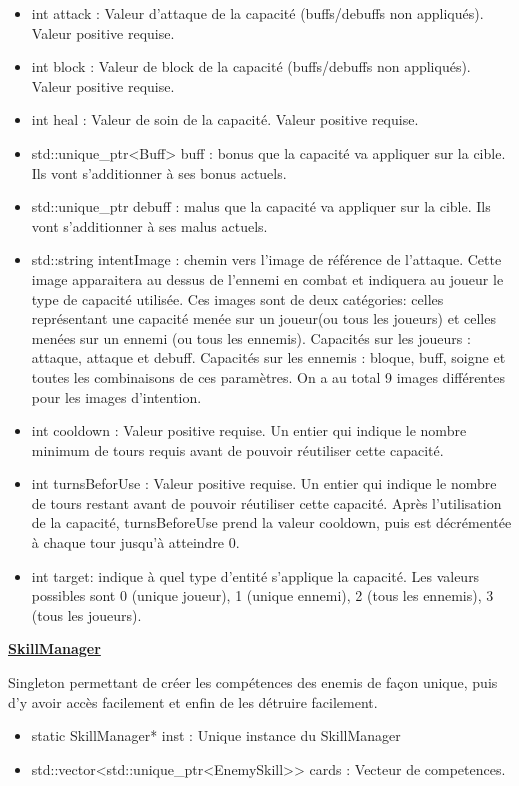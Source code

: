 \begin{itemize}
    \item int attack : Valeur d'attaque de la capacité (buffs/debuffs non appliqués). Valeur positive requise.
    \item int block : Valeur de block de la capacité (buffs/debuffs non appliqués). Valeur positive requise.
    \item int heal : Valeur de soin de la capacité. Valeur positive requise.
    \item std::unique\_ptr<Buff>  buff : bonus que la capacité va appliquer sur la cible. Ils vont s'additionner à ses bonus actuels.
    \item std::unique\_ptr debuff : malus que la capacité va appliquer sur la cible. Ils vont s'additionner à ses malus actuels.
    \item std::string intentImage : chemin vers l'image de référence de l'attaque. Cette image apparaitera au dessus de l'ennemi en combat et indiquera au joueur le type de capacité utilisée. Ces images sont de deux catégories: celles représentant une capacité menée sur un joueur(ou tous les joueurs) et celles menées sur un ennemi (ou tous les ennemis).
    Capacités sur les joueurs : attaque, attaque et debuff.
    Capacités sur les ennemis : bloque, buff, soigne et toutes les combinaisons de ces paramètres. On a au total 9 images différentes pour les images d'intention.
    \item int cooldown : Valeur positive requise. Un entier qui indique le nombre minimum de tours requis avant de pouvoir réutiliser cette capacité. 
    \item int turnsBeforUse : Valeur positive requise. Un entier qui indique le nombre de tours restant avant de pouvoir réutiliser cette capacité. Après l'utilisation de la capacité, turnsBeforeUse prend la valeur cooldown, puis est décrémentée à chaque tour jusqu'à atteindre 0.
    \item int target: indique à quel type d'entité s'applique la capacité. Les valeurs possibles sont 0 (unique joueur), 1 (unique ennemi), 2 (tous les ennemis), 3 (tous les joueurs).
\end{itemize}

\underline{\textbf{SkillManager}}
\par Singleton permettant de créer les compétences des enemis de façon unique, puis d'y avoir accès facilement et enfin de les détruire facilement.
\begin{itemize}
    \item static SkillManager* inst : Unique instance du SkillManager
    \item std::vector<std::unique\_ptr<EnemySkill>> cards : Vecteur de competences.
\end{itemize}


